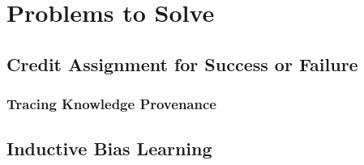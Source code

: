 \chapter{Problems to Solve}\label{ch:problems_to_solve}

\section{Credit Assignment for Success or Failure}

\subsection{Tracing Knowledge Provenance}

\section{Inductive Bias Learning}

